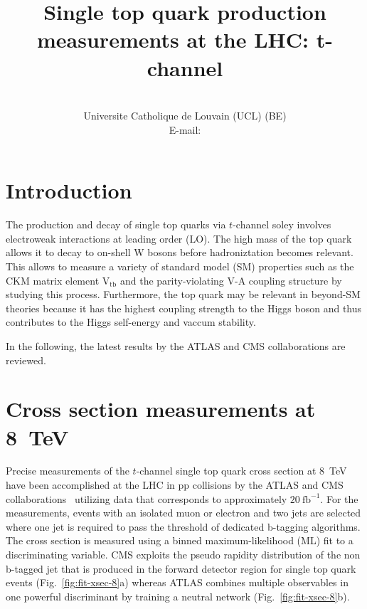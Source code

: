 \documentclass{PoS}
\title{Single top quark production measurements at the LHC: t-channel}
\author{
    \speaker{Matthias Komm}\\
    Universite Catholique de Louvain (UCL) (BE)\\
    E-mail: \email{Matthias.Komm@cern.ch}
}
\begin{document}
\section{Introduction}
The production and decay of single top quarks via $t$-channel soley involves electroweak interactions at leading order (LO). The high mass of the top quark allows it to decay to on-shell W bosons before hadroniztation becomes relevant. This allows to measure a variety of standard model (SM) properties such as the CKM matrix element $\mathrm{V_{tb}}$ and the parity-violating V-A coupling structure by studying this process. Furthermore, the top quark may be relevant in beyond-SM theories because it has the highest coupling strength to the Higgs boson and thus contributes to the Higgs self-energy and vaccum stability.

In the following, the latest results by the ATLAS and CMS collaborations are reviewed.

\section{Cross section measurements at 8~TeV}
Precise measurements of the $t$-channel single top quark cross section at 8~TeV have been accomplished at the LHC in pp collisions by the ATLAS and CMS collaborations~\cite{atlas-xsec8,cms-xsec8} utilizing data that corresponds to approximately $20~\mathrm{fb}^{-1}$. For the measurements, events with an isolated muon or electron and two jets are selected where one jet is required to pass the threshold of dedicated b-tagging algorithms. The cross section is measured using a binned maximum-likelihood (ML) fit to a discriminating variable. CMS exploits the pseudo rapidity distribution of the non b-tagged jet that is produced in the forward detector region for single top quark events (Fig.~\ref{fig:fit-xsec-8}a) whereas ATLAS combines multiple observables in one powerful discriminant by training a neutral network (Fig.~\ref{fig:fit-xsec-8}b).
\end{document}
